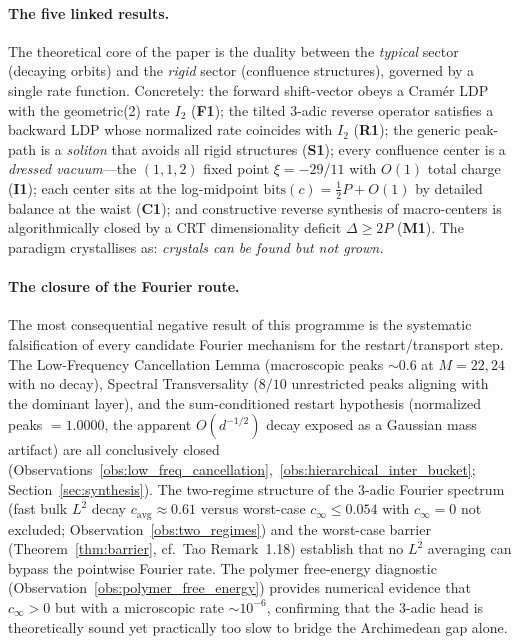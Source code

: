 \documentclass[12pt,a4paper]{article}
\begin{document}
\paragraph{The five linked results.}
The theoretical core of the paper is the duality between the \emph{typical}
sector (decaying orbits) and the \emph{rigid} sector (confluence structures),
governed by a single rate function.  Concretely: the forward shift-vector
obeys a Cram\'er LDP with the geometric(2) rate $I_2$ (\textbf{F1}); the
tilted $3$-adic reverse operator satisfies a backward LDP whose normalized
rate coincides with $I_2$ (\textbf{R1}); the generic peak-path is a
\emph{soliton} that avoids all rigid structures (\textbf{S1}); every
confluence center is a \emph{dressed vacuum}---the $(1,1,2)$ fixed point
$\xi=-29/11$ with $O(1)$ total charge (\textbf{I1}); each center sits at the
log-midpoint $\mathrm{bits}(c)=\tfrac12 P+O(1)$ by detailed balance at the
waist (\textbf{C1}); and constructive reverse synthesis of macro-centers is
algorithmically closed by a CRT dimensionality deficit $\Delta\ge 2P$
(\textbf{M1}).  The paradigm crystallises as: \emph{crystals can be found but
not grown.}

\paragraph{The closure of the Fourier route.}
The most consequential negative result of this programme is the systematic
falsification of every candidate Fourier mechanism for the restart/transport
step.  The Low-Frequency Cancellation Lemma (macroscopic peaks $\sim0.6$ at
$M=22,24$ with no decay), Spectral Transversality ($8/10$ unrestricted peaks
aligning with the dominant layer), and the sum-conditioned restart hypothesis
(normalized peaks $=1.0000$, the apparent $O(d^{-1/2})$ decay exposed as a
Gaussian mass artifact) are all conclusively closed
(Observations~\ref{obs:low_freq_cancellation},~\ref{obs:hierarchical_inter_bucket};
Section~\ref{sec:synthesis}).  The two-regime structure of the $3$-adic
Fourier spectrum (fast bulk $L^2$ decay $c_{\mathrm{avg}}\approx0.61$ versus
worst-case $c_\infty\le0.054$ with $c_\infty=0$ not excluded;
Observation~\ref{obs:two_regimes}) and the worst-case barrier
(Theorem~\ref{thm:barrier}, cf.\ Tao Remark~1.18) establish that no $L^2$
averaging can bypass the pointwise Fourier rate.  The polymer free-energy
diagnostic (Observation~\ref{obs:polymer_free_energy}) provides numerical
evidence that $c_\infty>0$ but with a microscopic rate $\sim10^{-6}$,
confirming that the $3$-adic head is theoretically sound yet practically too
slow to bridge the Archimedean gap alone.
\end{document}
